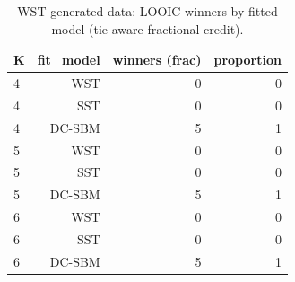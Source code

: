 \begin{table}[!h]
\centering
\caption{WST-generated data: LOOIC winners by fitted model (tie-aware fractional credit).\\\label{tab:wst-appx-loo-winners}}
\centering
\begin{tabular}[t]{lrrr}
\toprule
K & fit_model & winners (frac) & proportion\\
\midrule
4 & WST & 0 & 0\\
4 & SST & 0 & 0\\
4 & DC-SBM & 5 & 1\\
5 & WST & 0 & 0\\
5 & SST & 0 & 0\\
5 & DC-SBM & 5 & 1\\
6 & WST & 0 & 0\\
6 & SST & 0 & 0\\
6 & DC-SBM & 5 & 1\\
\bottomrule
\end{tabular}
\end{table}

